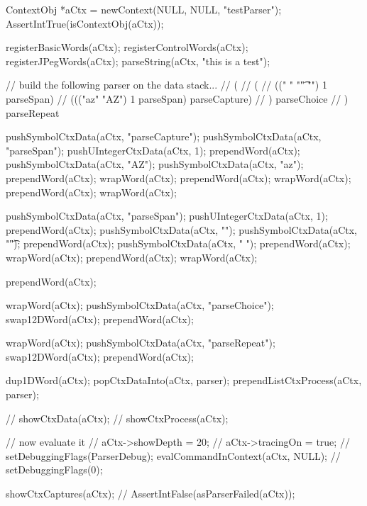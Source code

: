 

\startCTest
  ContextObj *aCtx = newContext(NULL, NULL, "testParser");
  AssertIntTrue(isContextObj(aCtx));
  
  registerBasicWords(aCtx);
  registerControlWords(aCtx);
  registerJPegWords(aCtx);
  parseString(aCtx, "this is a test");

  // build the following parser on the data stack...
  // ( 
  //   (
  //     ((" " "\t" "\n") 1 parseSpan)
  //     ((("az" "AZ") 1 parseSpan) parseCapture)
  //   ) parseChoice
  // ) parseRepeat

  pushSymbolCtxData(aCtx, "parseCapture");
  pushSymbolCtxData(aCtx, "parseSpan");
  pushUIntegerCtxData(aCtx, 1);
  prependWord(aCtx);
  pushSymbolCtxData(aCtx, "AZ");
  pushSymbolCtxData(aCtx, "az");
  prependWord(aCtx);
  wrapWord(aCtx);
  prependWord(aCtx);
  wrapWord(aCtx);
  prependWord(aCtx);
  wrapWord(aCtx);
  
  pushSymbolCtxData(aCtx, "parseSpan");
  pushUIntegerCtxData(aCtx, 1);
  prependWord(aCtx);
  pushSymbolCtxData(aCtx, "\n");
  pushSymbolCtxData(aCtx, "\t");
  prependWord(aCtx);
  pushSymbolCtxData(aCtx, " ");
  prependWord(aCtx);
  wrapWord(aCtx);
  prependWord(aCtx);
  wrapWord(aCtx);
  
  prependWord(aCtx);
  
  wrapWord(aCtx);
  pushSymbolCtxData(aCtx, "parseChoice");
  swap12DWord(aCtx);
  prependWord(aCtx);
  
  wrapWord(aCtx);
  pushSymbolCtxData(aCtx, "parseRepeat");
  swap12DWord(aCtx);
  prependWord(aCtx);
  
  dup1DWord(aCtx);
  popCtxDataInto(aCtx, parser);
  prependListCtxProcess(aCtx, parser);
  
//  showCtxData(aCtx);
//  showCtxProcess(aCtx);
  
  // now evaluate it
//  aCtx->showDepth = 20;
//  aCtx->tracingOn = true;
//  setDebuggingFlags(ParserDebug);
  evalCommandInContext(aCtx, NULL);
//  setDebuggingFlags(0);
  
  showCtxCaptures(aCtx);
//  AssertIntFalse(asParserFailed(aCtx));
\stopCTest
\stopTestCase
\stopTestSuite